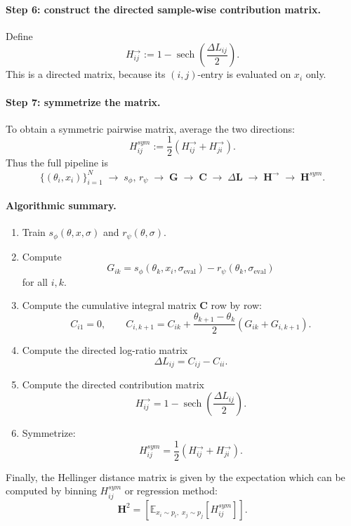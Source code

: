 \paragraph{Step 6: construct the directed sample-wise contribution matrix.}
Define
\[
H^{\rightarrow}_{ij}
:=
1-\operatorname{sech}\!\left(\frac{\Delta L_{ij}}{2}\right).
\]
This is a directed matrix, because its \((i,j)\)-entry is evaluated on \(x_i\) only.

\paragraph{Step 7: symmetrize the matrix.}
To obtain a symmetric pairwise matrix, average the two directions:
\[
H^{sym}_{ij}
:=
\frac12\left(H^{\rightarrow}_{ij}+H^{\rightarrow}_{ji}\right).
\]
Thus the full pipeline is
\[
\{(\theta_i,x_i)\}_{i=1}^N
\;\longrightarrow\;
s_{\phi},\,r_{\psi}
\;\longrightarrow\;
\mathbf G
\;\longrightarrow\;
\mathbf C
\;\longrightarrow\;
\Delta \mathbf L
\;\longrightarrow\;
\mathbf H^{\rightarrow}
\;\longrightarrow\;
\mathbf H^{sym}.
\]

\paragraph{Algorithmic summary.}
\begin{enumerate}
    \item Train \(s_{\phi}(\theta,x,\sigma)\) and \(r_{\psi}(\theta,\sigma)\).
    \item Compute
    \[
    G_{ik}=s_{\phi}(\theta_k,x_i,\sigma_{\mathrm{eval}})
    -
    r_{\psi}(\theta_k,\sigma_{\mathrm{eval}})
    \]
    for all \(i,k\).
    \item Compute the cumulative integral matrix \(\mathbf C\) row by row:
    \[
    C_{i1}=0,\qquad
    C_{i,k+1}=C_{ik}+\frac{\theta_{k+1}-\theta_k}{2}(G_{ik}+G_{i,k+1}).
    \]
    \item Compute the directed log-ratio matrix
    \[
    \Delta L_{ij}=C_{ij}-C_{ii}.
    \]
    \item Compute the directed contribution matrix
    \[
    H^{\rightarrow}_{ij}
    =
    1-\operatorname{sech}\!\left(\frac{\Delta L_{ij}}{2}\right).
    \]
    \item Symmetrize:
    \[
    H^{sym}_{ij}
    =
    \frac12\left(H^{\rightarrow}_{ij}+H^{\rightarrow}_{ji}\right).
    \]
\end{enumerate}

Finally, the Hellinger distance matrix is given by the expectation which can be computed by binning $H^{sym}_{ij}$ or regression method:
\[
\mathbf H^2=[\mathbb E_{x_i\sim p_i,\;x_j\sim p_j}[H^{sym}_{ij}]].
\]

